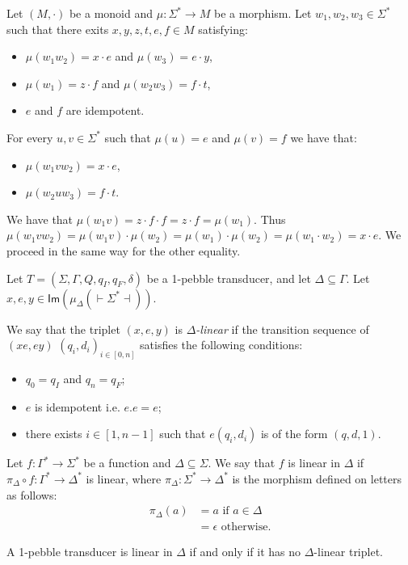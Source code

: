 \begin{lemma}
Let $(M,\cdot)$ be a monoid and $\mu:\Sigma^*\to M$ be a morphism. Let $w_1,w_2, w_3\in\Sigma^*$ such that there exits $x,y,z,t,e,f\in M$ satisfying:
\begin{itemize}
\item $\mu(w_1w_2)=x\cdot e$ and $\mu(w_3)=e\cdot y$,
\item $\mu(w_1)=z\cdot f$ and $\mu(w_2w_3)=f\cdot t$,
\item $e$ and $f$ are idempotent.
\end{itemize}
For every $u, v\in\Sigma^*$ such that $\mu(u)=e$ and $\mu(v)=f$ we have that:
\begin{itemize}
\item $\mu(w_1vw_2)=x\cdot e$, 
\item $\mu(w_2uw_3)=f\cdot t$.
\end{itemize}
\end{lemma}

\begin{pr}
We have that $\mu(w_1v)=z\cdot f\cdot f=z\cdot f=\mu(w_1)$.
Thus $\mu(w_1vw_2)=\mu(w_1v)\cdot \mu(w_2)=\mu(w_1)\cdot \mu(w_2)=\mu(w_1\cdot w_2) =x\cdot e$.
We proceed in the same way for the other equality.
\end{pr}

\begin{definition}
Let $T=(\Sigma,\Gamma,Q,q_I,q_F, \delta)$ be a 1-pebble transducer, and let $\Delta\subseteq \Gamma$. Let $x, e, y\in \mathsf{Im}(\mu_\Delta(\vdash \Sigma^* \dashv))$.

We say that the triplet $(x,e,y)$ is \emph{$\Delta$-linear} if the transition sequence of $(xe,ey)$
$(q_i,d_i)_{i\in[0,n]}$ satisfies the following conditions:
\begin{itemize}
\item $q_0=q_I$ and $q_n=q_F$;
\item $e$ is idempotent i.e. $e.e=e$;
\item there exists $i\in [1,n-1]$ such that $e(q_i,d_i)$ is of the form $(q,d,1)$.
\end{itemize}
\end{definition}

 \begin{definition}
Let $f:\Gamma^*\to \Sigma^*$ be a function and $\Delta\subseteq\Sigma$. We say that $f$ is linear in $\Delta$ if $\pi_\Delta\circ f: \Gamma^*\to \Delta^*$ is linear, where $\pi_\Delta:\Sigma^*\to \Delta^*$ is the morphism defined on letters as follows:
\begin{align*}
\pi_\Delta(a)&=a \text{ if }  a\in \Delta \\
&= \epsilon \text{ otherwise.}
\end{align*}
 \end{definition}
 
\begin{theorem}
A 1-pebble transducer is linear in $\Delta$ if and only if it has no $\Delta$-linear triplet.
\end{theorem}